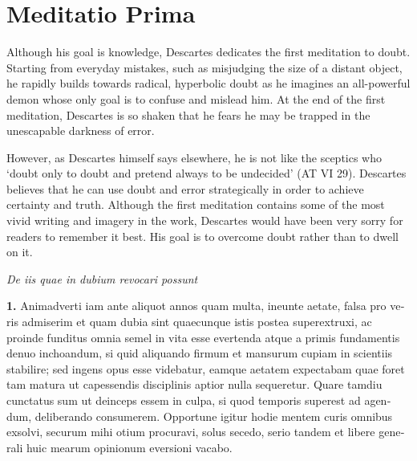 \chapter{Meditatio Prima}


Although his goal is knowledge, Descartes dedicates the first meditation to doubt. Starting from everyday mistakes, such as misjudging the size of a distant object, he rapidly builds towards radical, hyperbolic doubt as he imagines an all-powerful demon whose only goal is to confuse and mislead him. At the end of the first meditation, Descartes is so shaken that he fears he may be trapped in the unescapable darkness of error.

However, as Descartes himself says elsewhere, he is not like the sceptics who `doubt only to doubt and pretend always to be undecided' (AT VI 29). Descartes believes that he can use doubt and error strategically in order to achieve certainty and truth. Although the first meditation contains some of the most vivid writing and imagery in the work, Descartes would have been very sorry for readers to remember it best. His goal is to overcome doubt rather than to dwell on it.

\clearpage
\begin{center}
    \beginnumbering
    \numberlinefalse
    \pstart
    \textit{De iis quae in dubium revocari possunt}
    \pend
    \endnumbering
\end{center}

\beginnumbering
\pstart
\begin{latin}
    \textenglish{\textbf{1.}} Animadverti iam ante aliquot annos quam multa, ineunte aetate, falsa pro veris admiserim et quam dubia sint quaecunque istis postea superextruxi, ac proinde funditus omnia semel in vita esse evertenda atque a primis fundamentis denuo inchoandum, si quid aliquando firmum et mansurum cupiam in scientiis stabilire; sed ingens opus esse videbatur, eamque aetatem expectabam quae foret tam matura ut capessendis disciplinis aptior nulla sequeretur. Quare tamdiu cunctatus sum ut deinceps essem in culpa, si quod temporis superest ad agendum, deliberando consumerem. Opportune igitur hodie mentem curis omnibus exsolvi, securum mihi otium procuravi, solus secedo, serio tandem et libere generali huic mearum opinionum eversioni vacabo.
\end{latin}
\pend
\endnumbering

